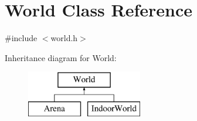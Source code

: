 \hypertarget{classWorld}{}\section{World Class Reference}
\label{classWorld}


{\ttfamily \#include $<$world.\+h$>$}

Inheritance diagram for World\+:\begin{figure}[H]
\begin{center}
\leavevmode
\includegraphics[height=2.000000cm]{classWorld}
\end{center}
\end{figure}
